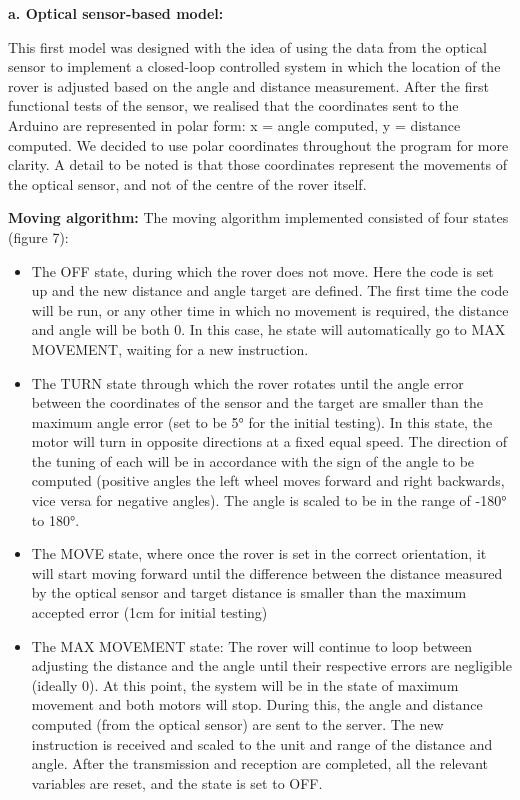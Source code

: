 \documentclass[10pt,twoside]{article}
\begin{document}
\textbf{ a.	Optical sensor-based model:}

This first model was designed with the idea of using the data from the optical sensor to implement a closed-loop controlled system in which the location of the rover is adjusted based on the angle and distance measurement. After the first functional tests of the sensor, we realised that the coordinates sent to the Arduino are represented in polar form: x = angle computed, y = distance computed. We decided to use polar coordinates throughout the program for more clarity. A detail to be noted is that those coordinates represent the movements of the optical sensor, and not of the centre of the rover itself.

\textbf{Moving algorithm:} The moving algorithm implemented consisted of four states (figure 7): 
\begin{itemize}
    \item The OFF state, during which the rover does not move. Here the code is set up and the new distance and angle target are defined. The first time the code will be run, or any other time in which no movement is required, the distance and angle will be both 0. In this case, he state will automatically go to MAX MOVEMENT, waiting for a new instruction.
	\item The TURN state through which the rover rotates until the angle error between the coordinates of the sensor and the target are smaller than the maximum angle error (set to be 5° for the initial testing). In this state, the motor will turn in opposite directions at a fixed equal speed. The direction of the tuning of each will be in accordance with the sign of the angle to be computed (positive angles the left wheel moves forward and right backwards, vice versa for negative angles). The angle is scaled to be in the range of -180° to 180°.
	\item The MOVE state, where once the rover is set in the correct orientation, it will start moving forward until the difference between the distance measured by the optical sensor and target distance is smaller than the maximum accepted error (1cm for initial testing)
	\item The MAX MOVEMENT state: The rover will continue to loop between adjusting the distance and the angle until their respective errors are negligible (ideally 0). At this point, the system will be in the state of maximum movement and both motors will stop. During this, the angle and distance computed (from the optical sensor) are sent to the server. The new instruction is received and scaled to the unit and range of the distance and angle. After the transmission and reception are completed, all the relevant variables are reset, and the state is set to OFF.
\end{itemize}
\end{document}

